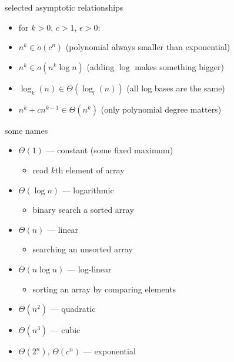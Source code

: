 

\begin{frame}{selected asymptotic relationships}
\begin{itemize}
\item for $k>0$, $c>1$, $\epsilon>0$:
\item $n^k \in o(c^n)$ (polynomial always smaller than exponential)
\item $n^k \in o(n^k \log n)$ (adding $\log$ makes something bigger)
\item $\log_k(n) \in \Theta(\log_l(n))$ (all log bases are the same)
\item $n^k+cn^{k-1} \in \Theta(n^k)$ (only polynomial degree matters)
\end{itemize}
\end{frame}

\begin{frame}{some names}
\begin{itemize}
\item $\Theta(1)$ --- constant (some fixed maximum)
    \begin{itemize}
    \item read $k$th element of array
    \end{itemize}
\item $\Theta(\log n)$ --- logarithmic
    \begin{itemize}
    \item binary search a sorted array
    \end{itemize}
\item $\Theta(n)$ --- linear
    \begin{itemize}
    \item searching an unsorted array
    \end{itemize}
\item $\Theta(n\log n)$ --- log-linear
    \begin{itemize}
    \item sorting an array by comparing elements
    \end{itemize}
\item $\Theta(n^2)$ --- quadratic
\item $\Theta(n^3)$ --- cubic
\item $\Theta(2^n)$, $\Theta(c^n)$ --- exponential
\end{itemize}
\end{frame}
